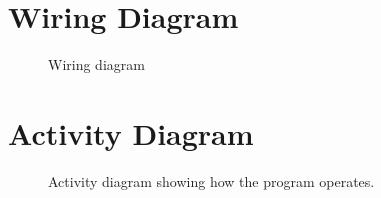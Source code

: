\documentclass[a4paper,twoside,titlepage]{article}
\begin{document}
%  
%  

    \clearpage
    \appendix
	\section{Wiring Diagram}\label{wiring-diagram}
	\begin{figure}[!htp]
        \centering
        \caption{Wiring diagram}
        \label{fig:wiring-diagram}
    \end{figure}

	\section{Activity Diagram}\label{activity-diagram}
	\begin{figure}[!htp]
        \centering
        \caption{Activity diagram showing how the program operates.}
        \label{fig:activity-diagram}
    \end{figure}
\end{document}
